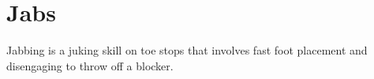 \section*{Jabs}
\label{sec:toe_stop/jabs}

Jabbing is a juking skill on toe stops that involves fast foot placement and disengaging to throw off a blocker.
